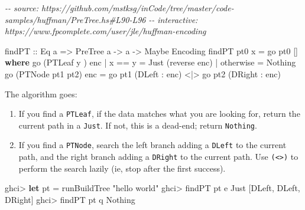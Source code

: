 \documentclass[]{article}
\newenvironment{Shaded}{}{}
\newcommand{\CharTok}[1]{\textcolor[rgb]{0.25,0.44,0.63}{#1}}
\newcommand{\CommentTok}[1]{\textcolor[rgb]{0.38,0.63,0.69}{\textit{#1}}}
\newcommand{\DataTypeTok}[1]{\textcolor[rgb]{0.56,0.13,0.00}{#1}}
\newcommand{\FunctionTok}[1]{\textcolor[rgb]{0.02,0.16,0.49}{#1}}
\newcommand{\KeywordTok}[1]{\textcolor[rgb]{0.00,0.44,0.13}{\textbf{#1}}}
\newcommand{\NormalTok}[1]{#1}
\newcommand{\OperatorTok}[1]{\textcolor[rgb]{0.40,0.40,0.40}{#1}}
\newcommand{\OtherTok}[1]{\textcolor[rgb]{0.00,0.44,0.13}{#1}}
\newcommand{\StringTok}[1]{\textcolor[rgb]{0.25,0.44,0.63}{#1}}
\begin{document}
\begin{Shaded}
\begin{Highlighting}[]
\CommentTok{{-}{-} source: https://github.com/mstksg/inCode/tree/master/code{-}samples/huffman/PreTree.hs\#L90{-}L96}
\CommentTok{{-}{-} interactive: https://www.fpcomplete.com/user/jle/huffman{-}encoding}

\OtherTok{findPT ::} \DataTypeTok{Eq}\NormalTok{ a }\OtherTok{=>} \DataTypeTok{PreTree}\NormalTok{ a }\OtherTok{{-}>}\NormalTok{ a }\OtherTok{{-}>} \DataTypeTok{Maybe} \DataTypeTok{Encoding}
\NormalTok{findPT pt0 x }\OtherTok{=}\NormalTok{ go pt0 []}
  \KeywordTok{where}
\NormalTok{    go (}\DataTypeTok{PTLeaf}\NormalTok{ y      ) enc }\OperatorTok{|}\NormalTok{ x }\OperatorTok{==}\NormalTok{ y    }\OtherTok{=} \DataTypeTok{Just}\NormalTok{ (}\FunctionTok{reverse}\NormalTok{ enc)}
                            \OperatorTok{|} \FunctionTok{otherwise} \OtherTok{=} \DataTypeTok{Nothing}
\NormalTok{    go (}\DataTypeTok{PTNode}\NormalTok{ pt1 pt2) enc }\OtherTok{=}\NormalTok{ go pt1 (}\DataTypeTok{DLeft}  \OperatorTok{:}\NormalTok{ enc) }\OperatorTok{<|>}
\NormalTok{                              go pt2 (}\DataTypeTok{DRight} \OperatorTok{:}\NormalTok{ enc)}
\end{Highlighting}
\end{Shaded}

The algorithm goes:

\begin{enumerate}
\def\labelenumi{\arabic{enumi}.}
\item
  If you find a \texttt{PTLeaf}, if the data matches what you are looking for,
  return the current path in a \texttt{Just}. If not, this is a dead-end; return
  \texttt{Nothing}.
\item
  If you find a \texttt{PTNode}, search the left branch adding a \texttt{DLeft}
  to the current path, and the right branch adding a \texttt{DRight} to the
  current path. Use \texttt{(\textless{}\textbar{}\textgreater{})} to perform
  the search lazily (ie, stop after the first success).
\end{enumerate}

\begin{Shaded}
\begin{Highlighting}[]
\NormalTok{ghci}\OperatorTok{>} \KeywordTok{let}\NormalTok{ pt }\OtherTok{=}\NormalTok{ runBuildTree }\StringTok{"hello world"}
\NormalTok{ghci}\OperatorTok{>}\NormalTok{ findPT pt }\CharTok{\textquotesingle{}e\textquotesingle{}}
\DataTypeTok{Just}\NormalTok{ [}\DataTypeTok{DLeft}\NormalTok{, }\DataTypeTok{DLeft}\NormalTok{, }\DataTypeTok{DRight}\NormalTok{]}
\NormalTok{ghci}\OperatorTok{>}\NormalTok{ findPT pt }\CharTok{\textquotesingle{}q\textquotesingle{}}
\DataTypeTok{Nothing}
\end{Highlighting}
\end{Shaded}
\end{document}
